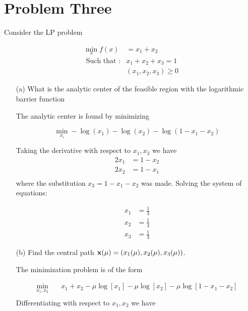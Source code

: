 \documentclass[answers]{exam} %
\newcommand\x{{\bf x}}
\begin{document}
\section*{Problem Three} Consider the LP problem 

\begin{equation*}
\begin{aligned}
\min_x  f(x) &= x_1 + x_2 \\ 
\mbox{ Such that }:&  x_1 + x_2 + x_3 = 1 \\ 
&(x_1, x_2, x_3) \geq 0
\end{aligned}
\end{equation*}

\begin{itemize}
\item[(a)] What is the analytic center of the feasible region with the logarithmic barrier function

\begin{framed}
The analytic center is found by minimizing 

\[
\min_{x_i} -\log(x_1) - \log(x_2) - \log(1 - x_1  - x_2 )
\]

Taking the derivative with respect to $x_1, x_2$ we have
\begin{equation*}
\begin{aligned}
2x_1 &= 1 - x_2 \\ 
2x_2 &= 1 - x_1 \\ 
\end{aligned}
\end{equation*}
where the substitution $x_3 = 1 - x_1 - x_2$ was made.
Solving the system of equations:

\begin{equation*}
\begin{aligned}
x_1 &= \frac{1}{3} \\ 
x_2 &= \frac{1}{3}\\ 
x_3 &= \frac{1}{3} 
\end{aligned}
\end{equation*}

\end{framed}
\item[(b)] Find the central path $\x(\mu) = (x_1(\mu), x_2(\mu), x_3(\mu))$. 

\begin{framed}
The minimization problem is of the form 

\begin{equation*}
\begin{aligned}
\min_{x_1, x_2} \quad & x_1 + x_2 - \mu \log[x_1] - \mu \log[x_2] -  \mu \log[1 - x_1 - x_2] \\ 
\end{aligned}
\end{equation*}
Differentiating with respect to $x_1, x_2$ we have 


\end{framed}
\end{itemize}
\end{document}

